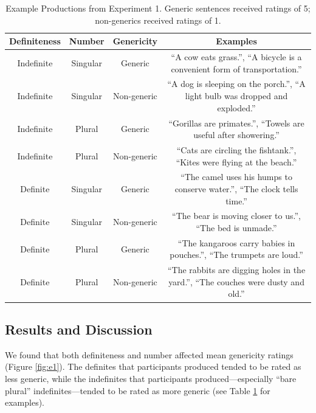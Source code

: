 \documentclass[10pt,letterpaper]{article}
\begin{document}
\begin{table}
\begin{center} 
\caption{Example Productions from Experiment 1. Generic sentences received ratings of 5; non-generics received ratings of 1.} 
\label{tab:ex} 
\vskip 0.12in
\begin{tabular}{cccc} 
\hline
Definiteness    &  Number & Genericity & Examples \\
\hline
Indefinite        &   Singular & Generic & ``A cow eats grass.'', ``A bicycle is a convenient form of transportation.''\\
Indefinite  &   Singular & Non-generic & ``A dog is sleeping on the porch.'', ``A light bulb was dropped and exploded.''\\
Indefinite           &   Plural & Generic & ``Gorillas are primates.'', ``Towels are useful after showering.''\\
Indefinite         &   Plural  & Non-generic & ``Cats are circling the fishtank.'', ``Kites were flying at the beach.''\\
Definite        &   Singular & Generic & ``The camel uses his humps to conserve water.'', ``The clock tells time.''  \\
Definite  &   Singular & Non-generic & ``The bear is moving closer to us.'', ``The bed is unmade.''\\
Definite           &   Plural & Generic & ``The kangaroos carry babies in pouches.'', ``The trumpets are loud.'' \\
Definite         &   Plural & Non-generic & ``The rabbits are digging holes in the yard.'', ``The couches were dusty and old.''\\
\hline
\end{tabular} 
\end{center} 
\end{table}

\subsection{Results and Discussion}

We found that both definiteness and number affected mean genericity ratings (Figure \ref{fig:e1}). The definites that participants produced tended to be rated as less generic, while the indefinites that participants produced---especially ``bare plural'' indefinites---tended to be rated as more generic (see Table \ref{tab:ex} for examples).
\end{document}
